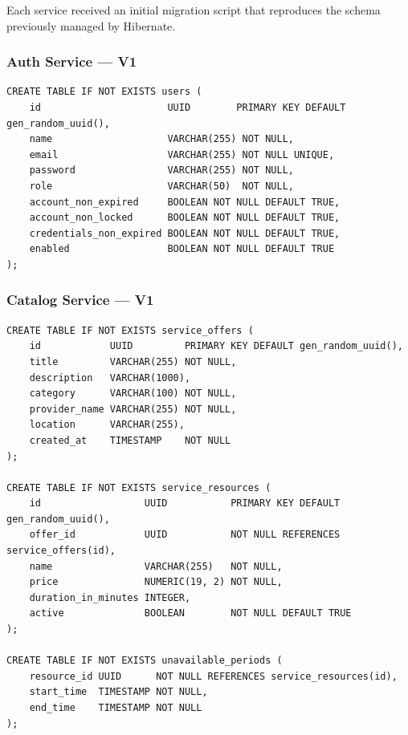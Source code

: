 Each service received an initial migration script that reproduces the schema previously managed by Hibernate.

\subsubsection{Auth Service --- V1}

\begin{lstlisting}[style=sqlstyle, caption={V1\_\_create\_users\_table.sql}]
CREATE TABLE IF NOT EXISTS users (
    id                      UUID        PRIMARY KEY DEFAULT gen_random_uuid(),
    name                    VARCHAR(255) NOT NULL,
    email                   VARCHAR(255) NOT NULL UNIQUE,
    password                VARCHAR(255) NOT NULL,
    role                    VARCHAR(50)  NOT NULL,
    account_non_expired     BOOLEAN NOT NULL DEFAULT TRUE,
    account_non_locked      BOOLEAN NOT NULL DEFAULT TRUE,
    credentials_non_expired BOOLEAN NOT NULL DEFAULT TRUE,
    enabled                 BOOLEAN NOT NULL DEFAULT TRUE
);
\end{lstlisting}

\subsubsection{Catalog Service --- V1}

\begin{lstlisting}[style=sqlstyle, caption={V1\_\_create\_catalog\_tables.sql}]
CREATE TABLE IF NOT EXISTS service_offers (
    id            UUID         PRIMARY KEY DEFAULT gen_random_uuid(),
    title         VARCHAR(255) NOT NULL,
    description   VARCHAR(1000),
    category      VARCHAR(100) NOT NULL,
    provider_name VARCHAR(255) NOT NULL,
    location      VARCHAR(255),
    created_at    TIMESTAMP    NOT NULL
);

CREATE TABLE IF NOT EXISTS service_resources (
    id                  UUID           PRIMARY KEY DEFAULT gen_random_uuid(),
    offer_id            UUID           NOT NULL REFERENCES service_offers(id),
    name                VARCHAR(255)   NOT NULL,
    price               NUMERIC(19, 2) NOT NULL,
    duration_in_minutes INTEGER,
    active              BOOLEAN        NOT NULL DEFAULT TRUE
);

CREATE TABLE IF NOT EXISTS unavailable_periods (
    resource_id UUID      NOT NULL REFERENCES service_resources(id),
    start_time  TIMESTAMP NOT NULL,
    end_time    TIMESTAMP NOT NULL
);
\end{lstlisting}

